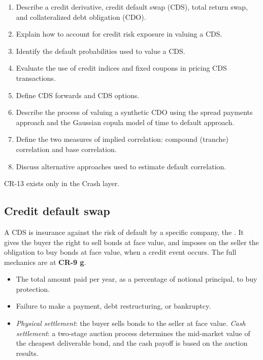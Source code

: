 
\begin{crkeybox}
\begin{enumerate}[label=\textbf{\alph*.},leftmargin=2em]
\item Describe a credit derivative, credit default swap (CDS), total return swap, and collateralized debt obligation (CDO).
\item Explain how to account for credit risk exposure in valuing a CDS.
\item Identify the default probabilities used to value a CDS.
\item Evaluate the use of credit indices and fixed coupons in pricing CDS transactions.
\item Define CDS forwards and CDS options.
\item Describe the process of valuing a synthetic CDO using the spread payments approach and the Gaussian copula model of time to default approach.
\item Define the two measures of implied correlation: compound (tranche) correlation and base correlation.
\item Discuss alternative approaches used to estimate default correlation.
\end{enumerate}
\end{crkeybox}

\begin{crtrapbox}
CR-13 exists only in the Crash layer.
\end{crtrapbox}


\subsection*{Credit default swap}

A CDS is insurance against the risk of default by a specific company, the
. It gives the buyer the right to sell bonds at face
value, and imposes on the seller the obligation to buy bonds at face value, when
a credit event occurs. The full mechanics are at \textbf{CR-9 g}.

\begin{itemize}
\item {} The total amount paid per year, as a percentage of
notional principal, to buy protection.
\item {} Failure to make a payment, debt
restructuring, or bankruptcy.
\item {} \emph{Physical settlement}: the buyer sells
bonds to the seller at face value. \emph{Cash settlement}: a two-stage auction
process determines the mid-market value of the cheapest deliverable bond, and the
cash payoff is based on the auction results.
\end{itemize}

